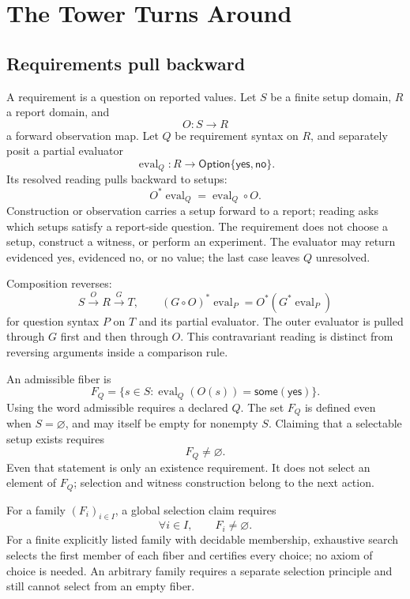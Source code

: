 \chapter{The Tower Turns Around}

\section{Requirements pull backward}

A requirement is a question on reported values.  Let \(S\) be a finite setup domain, \(R\) a report domain, and
\[
                              O:S\to R
\]
a forward observation map.  Let \(Q\) be requirement syntax on \(R\), and separately posit a partial evaluator
\[
       \operatorname{eval}_Q:R\to
       \mathsf{Option}\{\mathsf{yes},\mathsf{no}\}.
\]
Its resolved reading pulls backward to setups:
\[
                 O^*\operatorname{eval}_Q=\operatorname{eval}_Q\circ O.
\]
Construction or observation carries a setup forward to a report; reading asks which setups satisfy a report-side
question.  The requirement does not choose a setup, construct a witness, or perform an experiment.  The evaluator may
return evidenced yes, evidenced no, or no value; the last case leaves \(Q\) unresolved.

Composition reverses:
\[
 S\xrightarrow{O}R\xrightarrow{G}T,\qquad
 (G\circ O)^*\operatorname{eval}_P
   =O^*(G^*\operatorname{eval}_P)
\]
for question syntax \(P\) on \(T\) and its partial evaluator.  The outer evaluator is pulled through \(G\) first and
then through \(O\).
This contravariant reading is distinct from reversing arguments inside a comparison rule.

An admissible fiber is
\[
 F_Q=\{s\in S:\operatorname{eval}_Q(O(s))=\mathsf{some}(\mathsf{yes})\}.
\]
Using the word admissible requires a declared \(Q\).  The set \(F_Q\) is defined even when \(S=\varnothing\), and may
itself be empty for nonempty \(S\).  Claiming that a selectable setup exists requires
\[
                              F_Q\ne\varnothing.
\]
Even that statement is only an existence requirement.  It does not select an element of \(F_Q\); selection and witness
construction belong to the next action.

For a family \((F_i)_{i\in I}\), a global selection claim requires
\[
                         \forall i\in I,\qquad F_i\ne\varnothing.
\]
For a finite explicitly listed family with decidable membership, exhaustive search selects the first member of each
fiber and certifies every choice; no axiom of choice is needed.  An arbitrary family requires a separate selection
principle and still cannot select from an empty fiber.

